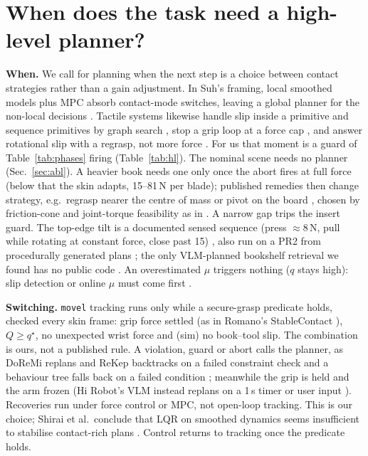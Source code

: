 \documentclass[10pt,twocolumn]{article}
\newcommand{\code}[1]{\texttt{\small #1}}
\begin{document}
\section{When does the task need a high-level planner?}\label{sec:hl}
\textbf{When.} We call for planning when the next step is a choice between contact strategies rather than a gain
adjustment. In Suh's framing, local smoothed models plus MPC absorb contact-mode switches, leaving a global planner
for the non-local decisions \cite{suh2025thesis,suh2025ctr}. Tactile systems likewise handle slip inside a
primitive and sequence primitives by graph search \cite{hogan2020tactile}, stop a grip loop at a force cap
\cite{dong2019maintaining}, and answer rotational slip with a regrasp, not more force \cite{kolamuri2021rotation}.
For us that moment is a guard of Table~\ref{tab:phases} firing (Table~\ref{tab:hl}). The nominal scene needs no
planner (Sec.~\ref{sec:abl}). A heavier book needs one only once the abort fires at full force (below that the
skin adapts, 15--81\,N per blade); published remedies then change strategy, e.g.\ regrasp nearer the centre of
mass \cite{kolamuri2021rotation} or pivot on the board \cite{hou2019pivot}, chosen by friction-cone and
joint-torque feasibility as in \cite{holladay2021}. A narrow gap trips the insert guard. The top-edge tilt is a
documented sensed sequence (press $\approx$8\,N, pull while rotating at constant force, close past
15\textdegree) \cite{prats2008riai}, also run on a PR2 from procedurally generated plans
\cite{wieczorek2022trixi}; the only VLM-planned bookshelf retrieval we found has no public code
\cite{ma2024dexdiff}. An overestimated $\mu$ triggers nothing ($q$ stays high): slip detection or online $\mu$
must come first \cite{su2015force,khamis2021friction}.

\textbf{Switching.} \code{movel} tracking runs only while a secure-grasp predicate holds, checked every skin frame:
grip force settled (as in Romano's StableContact \cite{romano2011}), $Q\ge q^\star$, no unexpected wrist force
and (sim) no book--tool slip. The combination is ours, not a published rule. A violation, guard or abort calls the
planner, as DoReMi replans and ReKep backtracks on a failed constraint check \cite{guo2024doremi,huang2024rekep}
and a behaviour tree falls back on a failed condition \cite{colledanchise2019blended}; meanwhile the grip is held
and the arm frozen (Hi Robot's VLM instead replans on a 1\,s timer or user input \cite{shi2025hirobot}).
Recoveries run under force control or MPC, not open-loop tracking. This is our choice; Shirai et al.\ conclude
that LQR on smoothed dynamics seems insufficient to stabilise contact-rich plans \cite{shirai2025linear}.
Control returns to tracking once the predicate holds.
\end{document}
